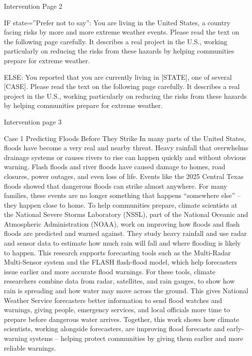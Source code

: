 \documentclass[
  letterpaper,
  DIV=11,
  numbers=noendperiod]{scrartcl}
\begin{document}
Intervention Page 2

IF state=''Prefer not to say'': You are living in the United States, a
country facing risks by more and more extreme weather events. Please
read the text on the following page carefully. It describes a real
project in the U.S., working particularly on reducing the risks from
these hazards by helping communities prepare for extreme weather.

ELSE: You reported that you are currently living in {[}STATE{]}, one of
several {[}CASE{]}. Please read the text on the following page
carefully. It describes a real project in the U.S., working particularly
on reducing the risks from these hazards by helping communities prepare
for extreme weather.

Intervention page 3

Case 1 Predicting Floods Before They Strike In many parts of the United
States, floods have become a very real and nearby threat. Heavy rainfall
that overwhelms drainage systems or causes rivers to rise can happen
quickly and without obvious warning. Flash floods and river floods have
caused damage to homes, road closures, power outages, and even loss of
life. Events like the 2025 Central Texas floods showed that dangerous
floods can strike almost anywhere. For many families, these events are
no longer something that happens ``somewhere else'' -- they happen close
to home. To help communities prepare, climate scientists at the National
Severe Storms Laboratory (NSSL), part of the National Oceanic and
Atmospheric Administration (NOAA), work on improving how floods and
flash floods are predicted and warned against. They study heavy rainfall
and use radar and sensor data to estimate how much rain will fall and
where flooding is likely to happen. This research supports forecasting
tools such as the Multi-Radar Multi-Sensor system and the FLASH
flash-flood model, which help forecasters issue earlier and more
accurate flood warnings. For these tools, climate researchers combine
data from radar, satellites, and rain gauges, to show how rain is
spreading and how water may move across the ground. This gives National
Weather Service forecasters better information to send flood watches and
warnings, giving people, emergency services, and local officials more
time to prepare before dangerous water arrives. Together, this work
shows how climate scientists, working alongside forecasters, are
improving flood forecasts and early-warning systems -- helping protect
communities by giving them earlier and more reliable warnings.
\end{document}

